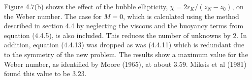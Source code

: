 Figure 4.7(b) shows the effect of the bubble ellipticity,
$\chi=2r_K/(z_N-z_0)$, on the Weber number.
The case for $M=0$, which is calculated using the method described 
in section 4.4 by neglecting the viscous and the buoyancy terms
from equation (4.4.5), is also included.
This reduces the number of unknowns by $2$.
In addition, equation (4.4.13) was dropped as was (4.4.11) which
is redundant due to the symmetry of the new problem. The results show
a maximum value for the Weber number, as identified by Moore (1965),
at about $3.59$. Miksis et al (1981) found this value to be $3.23$.


